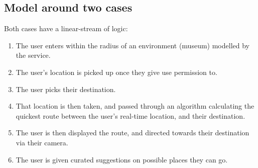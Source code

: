 \subsection*{Model around two cases}
Both cases have a linear-stream of logic:

\begin{enumerate}
    \item The user enters within the radius of an environment (museum) modelled by the service.
    \item The user’s location is picked up once they give use permission to.
    \item The user picks their destination.
    \item That location is then taken, and passed through an algorithm calculating the quickest route between the user’s real-time location, and their destination.
    \item The user is then displayed the route, and directed towards their destination via their camera.
    \item The user is given curated suggestions on possible places they can go.
\end{enumerate}